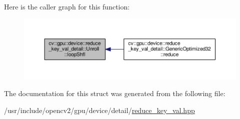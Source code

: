 Here is the caller graph for this function\-:\nopagebreak
\begin{figure}[H]
\begin{center}
\leavevmode
\includegraphics[width=350pt]{structcv_1_1gpu_1_1device_1_1reduce__key__val__detail_1_1Unroll_a4b58709ed74d7cd37b467f397197a47e_icgraph}
\end{center}
\end{figure}




The documentation for this struct was generated from the following file\-:\begin{DoxyCompactItemize}
\item 
/usr/include/opencv2/gpu/device/detail/\hyperlink{reduce__key__val_8hpp}{reduce\-\_\-key\-\_\-val.\-hpp}\end{DoxyCompactItemize}
